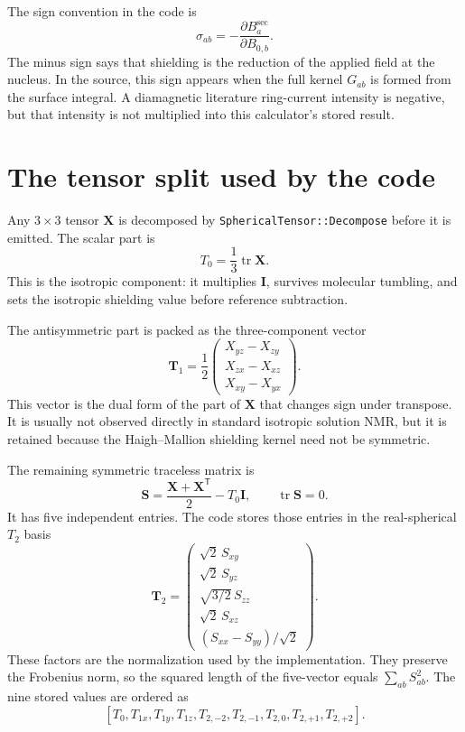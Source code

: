 \documentclass[11pt]{article}
\begin{document}
The sign convention in the code is
\begin{equation}
  \sigma_{ab}=-\frac{\partial B^{\mathrm{sec}}_a}{\partial B_{0,b}} .
  \label{eq:sign}
\end{equation}
The minus sign says that shielding is the reduction of the applied field at the
nucleus. In the source, this sign appears when the full kernel \(G_{ab}\) is
formed from the surface integral. A diamagnetic literature ring-current
intensity is negative, but that intensity is not multiplied into this
calculator's stored result.

\section{The tensor split used by the code}

Any \(3\times3\) tensor \(\bm X\) is decomposed by
\texttt{SphericalTensor::Decompose} before it is emitted. The scalar part is
\begin{equation}
  T_0=\frac{1}{3}\operatorname{tr}\bm X .
  \label{eq:t0}
\end{equation}
This is the isotropic component: it multiplies \(\bm I\), survives molecular
tumbling, and sets the isotropic shielding value before reference subtraction.

The antisymmetric part is packed as the three-component vector
\begin{equation}
  \bm T_1=\frac{1}{2}
  \begin{pmatrix}
    X_{yz}-X_{zy}\\
    X_{zx}-X_{xz}\\
    X_{xy}-X_{yx}
  \end{pmatrix}.
  \label{eq:t1}
\end{equation}
This vector is the dual form of the part of \(\bm X\) that changes sign under
transpose. It is usually not observed directly in standard isotropic solution
NMR, but it is retained because the Haigh--Mallion shielding kernel need not be
symmetric.

The remaining symmetric traceless matrix is
\begin{equation}
  \bm S=\frac{\bm X+\bm X^{\mathsf T}}{2}-T_0\bm I,
  \qquad \operatorname{tr}\bm S=0 .
  \label{eq:symmetric-traceless}
\end{equation}
It has five independent entries. The code stores those entries in the
real-spherical \(T_2\) basis
\begin{equation}
  \bm T_2=
  \begin{pmatrix}
    \sqrt{2}\,S_{xy}\\
    \sqrt{2}\,S_{yz}\\
    \sqrt{3/2}\,S_{zz}\\
    \sqrt{2}\,S_{xz}\\
    (S_{xx}-S_{yy})/\sqrt{2}
  \end{pmatrix}.
  \label{eq:t2}
\end{equation}
These factors are the normalization used by the implementation. They preserve
the Frobenius norm, so the squared length of the five-vector equals
\(\sum_{ab}S_{ab}^2\). The nine stored values are ordered as
\[
  [T_0,T_{1x},T_{1y},T_{1z},
    T_{2,-2},T_{2,-1},T_{2,0},T_{2,+1},T_{2,+2}] .
\]
\end{document}

